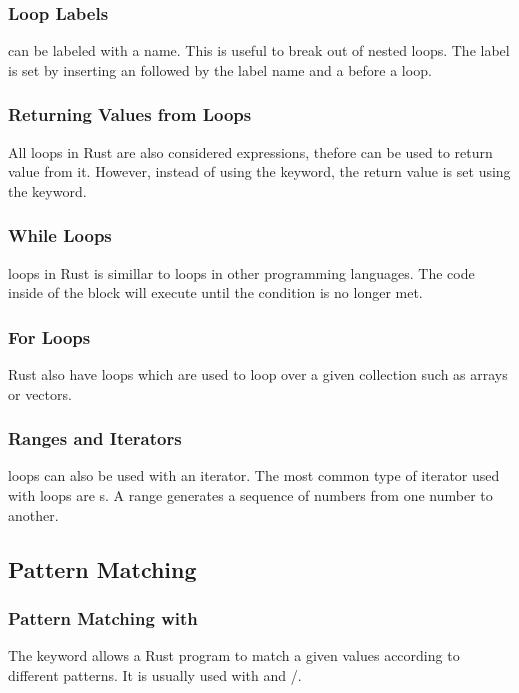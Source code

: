\documentclass{beamer}
\begin{document}
\begin{frame}[allowframebreaks]
  \frametitle{Loop Labels}
   can be labeled with a name. This is useful to break out of nested loops. The label is set by inserting an  followed by the label name and a \inlinecode{:} before a loop.
  
\end{frame}

\begin{frame}
  \frametitle{Returning Values from Loops}
  All loops in Rust are also considered expressions, thefore can be used to return value from it. However, instead of using the  keyword, the return value is set using the  keyword.
  
\end{frame}

\begin{frame}
  \frametitle{While Loops}
   loops in Rust is simillar to  loops in other programming languages. The code inside of the block will execute until the condition is no longer met.
  
\end{frame}

\begin{frame}
  \frametitle{For Loops}
  Rust also have  loops which are used to loop over a given collection such as arrays or vectors.
  
\end{frame}

\begin{frame}
  \frametitle{Ranges and Iterators}
   loops can also be used with an iterator. The most common type of iterator used with  loops are s. A range generates a sequence of numbers from one number to another.
  
\end{frame}

\subsection{Pattern Matching}
\begin{frame}
  \frametitle{Pattern Matching with }
  The  keyword allows a Rust program to match a given values according to different patterns. It is usually used with  and /.
  
\end{frame}
\end{document}
